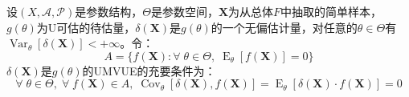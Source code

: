 \begin{theorem}\label{theo:UMVUE0UnbiasedEstimation}
	设$(X,\mathscr{A},\mathscr{P})$是参数结构，$\Theta$是参数空间，$\mathbf{X}$为从总体$F$中抽取的简单样本，$g(\theta)$为U可估的待估量，$\delta(\mathbf{X})$是$g(\theta)$的一个无偏估计量，对任意的$\theta\in\Theta$有$\operatorname{Var}_{\theta}[\delta(\mathbf{X})]<+\infty$。令：
	\begin{equation*}
		A=\{f(\mathbf{X}):\forall\;\theta\in\Theta,\;\operatorname{E}_{\theta}[f(\mathbf{X})]=0\}
	\end{equation*}
	$\delta(\mathbf{X})$是$g(\theta)$的UMVUE的充要条件为：
	\begin{equation*}
		\forall\;\theta\in\Theta,\;\forall\;f(\mathbf{X})\in A,\;\operatorname{Cov}_{\theta}[\delta(\mathbf{X}),f(\mathbf{X})]=\operatorname{E}_{\theta}[\delta(\mathbf{X})\cdot f(\mathbf{X})]=0
	\end{equation*}
\end{theorem}
